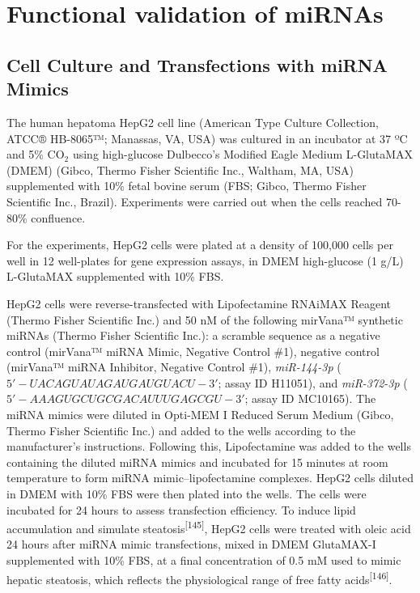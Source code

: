 \documentclass[
  11pt,
  letterpaper,
]{book}
\begin{document}
\section{Functional validation of
miRNAs}\label{functional-validation-of-mirnas}

\subsection{Cell Culture and Transfections with miRNA
Mimics}\label{cell-culture-and-transfections-with-mirna-mimics}

The human hepatoma HepG2 cell line (American Type Culture Collection,
ATCC® HB-8065™; Manassas, VA, USA) was cultured in an incubator at 37 ºC
and 5\% CO\(_2\) using high-glucose Dulbecco's Modified Eagle Medium
L-GlutaMAX (DMEM) (Gibco, Thermo Fisher Scientific Inc., Waltham, MA,
USA) supplemented with 10\% fetal bovine serum (FBS; Gibco, Thermo
Fisher Scientific Inc., Brazil). Experiments were carried out when the
cells reached 70-80\% confluence.

For the experiments, HepG2 cells were plated at a density of 100,000
cells per well in 12 well-plates for gene expression assays, in DMEM
high-glucose (1 g/L) L-GlutaMAX supplemented with 10\% FBS.

HepG2 cells were reverse-transfected with Lipofectamine RNAiMAX Reagent
(Thermo Fisher Scientific Inc.) and 50 nM of the following mirVana™
synthetic miRNAs (Thermo Fisher Scientific Inc.): a scramble sequence as
a negative control (mirVana™ miRNA Mimic, Negative Control \#1),
negative control (mirVana™ miRNA Inhibitor, Negative Control \#1),
\emph{miR-144-3p} (\(5'-UACAGUAUAGAUGAUGUACU-3'\); assay ID H11051), and
\emph{miR-372-3p} (\(5'-AAAGUGCUGCGACAUUUGAGCGU-3'\); assay ID MC10165).
The miRNA mimics were diluted in Opti-MEM I Reduced Serum Medium (Gibco,
Thermo Fisher Scientific Inc.) and added to the wells according to the
manufacturer's instructions. Following this, Lipofectamine was added to
the wells containing the diluted miRNA mimics and incubated for 15
minutes at room temperature to form miRNA mimic--lipofectamine
complexes. HepG2 cells diluted in DMEM with 10\% FBS were then plated
into the wells. The cells were incubated for 24 hours to assess
transfection efficiency. To induce lipid accumulation and simulate
steatosis\textsuperscript{{[}145{]}}, HepG2 cells were treated with
oleic acid 24 hours after miRNA mimic transfections, mixed in DMEM
GlutaMAX-I supplemented with 10\% FBS, at a final concentration of 0.5
mM used to mimic hepatic steatosis, which reflects the physiological
range of free fatty acids\textsuperscript{{[}146{]}}.
\end{document}
